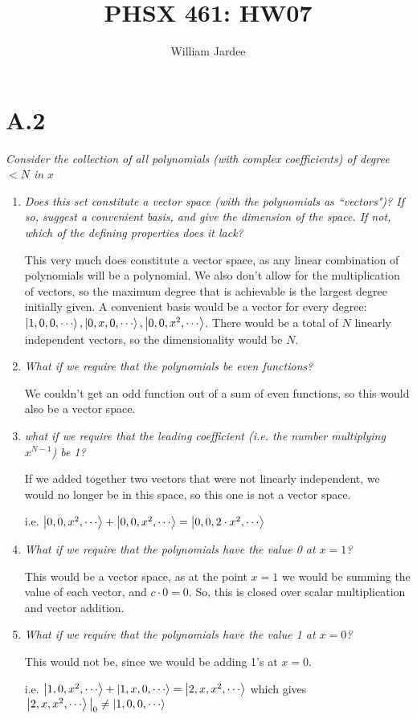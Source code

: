 \documentclass[12pt]{article}
\begin{document}
\title{PHSX 461: HW07}
\author{William Jardee}
\maketitle

\section*{A.2}
\emph{Consider the collection of all polynomials (with complex coefficients) of degree $<N$ in $x$}
\begin{enumerate}[label=\alph*)]
\item \emph{Does this set constitute a vector space (with the polynomials as ``vectors")? If so, suggest a convenient basis, and give the dimension of the space. If not, which of the defining properties does it lack?}
\bigskip 

This very much does constitute a vector space, as any linear combination of polynomials will be a polynomial. We also don't allow for the multiplication of vectors, so the maximum degree that is achievable is the largest degree initially given. A convenient basis would be a vector for every degree: $\ket{1,0,0,\cdots}, \ket{0,x,0,\cdots}, \ket{0,0,x^2,\cdots}$. There would be a total of $N$ linearly independent vectors, so the dimensionality would be $N$. 

\item \emph{What if we require that the polynomials be even functions?}\bigskip

We couldn't get an odd function out of a sum of even functions, so this would also be a vector space.

\item \emph{what if we require that the leading coefficient (i.e. the number multiplying $x^{N-1}$) be 1?}\bigskip

If we added together two vectors that were not linearly independent, we would no longer be in this space, so this one is not a vector space. 
\begin{center}
i.e. $\ket{0,0,x^2,\cdots} + \ket{0,0,x^2,\cdots} = \ket{0,0,2 \cdot x^2,\cdots}$
\end{center}

\item \emph{What if we require that the polynomials have the value 0 at $x=1$?} \bigskip

This would be a vector space, as at the point $x=1$ we would be summing the value of each vector, and $c \cdot 0 = 0$. So, this is closed over scalar multiplication and vector addition.

\item \emph{What if we require that the polynomials have the value 1 at $x=0$?}\bigskip

This would not be, since we would be adding 1's at $x=0$.
\begin{center}
i.e. $\ket{1,0,x^2,\cdots} + \ket{1,x,0,\cdots} = \ket{2,x,x^2,\cdots}$ which gives $\eval{\ket{2,x,x^2,\cdots}}_0 \neq \ket{1,0,0,\cdots}$
\end{center}
\end{enumerate}
\end{document}
